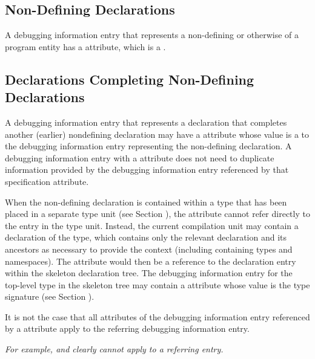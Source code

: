 \subsection{Non-Defining Declarations}
A debugging information entry that 
represents a non-defining 
or otherwise 
of a program entity has a
\DWATdeclaration{} attribute, which is a 
.

\subsection{Declarations Completing Non-Defining Declarations}
A debugging information entry that represents a 
\hypertarget{chap:DWATspecificationincompletenondefiningorseparatedeclaration}{}
declaration that completes another (earlier) 
non\dash defining declaration may have a 
\DWATspecification{}
attribute whose value is a  to
the debugging information entry representing the non-defining declaration. A debugging
information entry with a 
\DWATspecification{} 
attribute does not need to duplicate information
provided by the debugging information entry referenced by that specification attribute.

When the non-defining declaration is contained within a type that has
been placed in a separate type unit (see Section ), 
the \DWATspecification{} attribute cannot refer directly to the entry in
the type unit. Instead, the current compilation unit may contain a
 declaration of the type, which contains only the relevant
declaration and its ancestors as necessary to provide the context
(including containing types and namespaces). The \DWATspecification{}
attribute would then be a reference to the declaration entry within
the skeleton declaration tree. The debugging information entry for the
top-level type in the skeleton tree may contain a \DWATsignature{}
attribute whose value is the type signature 
(see Section ).


It is not the case that all attributes of the debugging information entry referenced by a
\DWATspecification{} attribute 
apply to the referring debugging information entry.

\textit{For 
example,
\DWATsibling{} and 
\DWATdeclaration{} 
clearly cannot apply to a 
referring
entry.}



